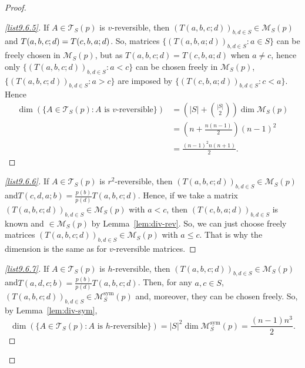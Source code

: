 \documentclass[10pt]{amsart}
\theoremstyle{definition}\newtheorem{defi}[theo]{Definition}\newtheorem{rema}[theo]{Remark}\newtheorem{exam}[theo]{Example}\newtheorem{exem}[theo]{Example}\newtheorem{nota}[theo]{Notation}
\newcounter{a}
\newcommand{\triang}[2]{\mathcal{T}_{#1} \left(#2 \right)}
\DeclareMathOperator{\sym}{sym}
\begin{document}
\begin{proof}
\begin{proof}[{\eqref{list9.6.5}}] If $A \in \triang{S}{p}$ is $v$-reversible, then $(T(a,b,c;d))_{b,d
\in S} \in \mathcal{M}_S(p)$ and $T(a,b,\linebreak c;d)= T(c,b,a;d)$. So, matrices $\{(T(a,b,a;d))_{b,d \in S} : a \in S\}$ can be freely chosen in $\mathcal{M}_S(p)$, but as $T(a,b,c;d) = T(c,b,a;d)$ when $a \neq c$, hence only $\{ (T(a,b,c;d))_{b,d \in S} : a<c \}$ can be chosen freely in $\mathcal{M}_S(p)$, $\{ (T(a,b,c;d))_{b,d \in S} : a>c \}$ are imposed by $\{ (T(c,b,a;d))_{b,d \in S} : c<a \}$. Hence
\begin{align*}
\dim \left(\{A \in \triang{S}{p} : \text{$A$ is $v$-reversible}\} \right) & = \left(|S| + \binom{|S|}{2} \right) \dim \mathcal{M}_S(p) \\
& = \left(n + \frac{n(n-1)}{2} \right) (n-1)^2\\
& = \frac{(n-1)^2 n (n+1)}{2}.
\end{align*}
\let\qed\relax
\end{proof}

\begin{proof}[{\eqref{list9.6.6}}] If $A \in \triang{S}{p}$ is $r^2$-reversible, then $(T(a,b,c;d))_{b,d \in S} \in \mathcal{M}_S(p)$ and\linebreak $T(c,d,a;b)= \frac{p(b)}{p(d)}T(a,b,c;d)$. Hence, if we take a matrix $(T(a,b,c;d))_{b,d \in S} \in \mathcal{M}_S(p)$ with $a<c$, then $(T(c,b,a;d))_{b,d \in S}$ is known and $\in \mathcal{M}_S(p)$ by Lemma~\ref{lem:div-rev}. So, we can just choose freely matrices $(T(a,b,c;d))_{b,d \in S} \in \mathcal{M}_S(p)$ with $a \leq c$. That is why the dimension is the same as for $v$-reversible matrices.
\let\qed\relax
\end{proof}

\begin{proof}[{\eqref{list9.6.7}}] If $A \in \triang{S}{p}$ is $h$-reversible, then $(T(a,b,c;d))_{b,d
\in S} \in \mathcal{M}_S(p)$ and\linebreak $T(a,d,c;b)= \frac{p(b)}{p(d)} T(a,b,c;d)$. Then, for any $a,c \in S$, $(T(a,b,c;d))_{b,d \in S} \in
\mathcal{M}^{\sym}_S(p)$ and, moreover, they can be chosen freely. So, by Lemma~\ref{lem:div-sym},
\[
\dim \left(\{A \in \triang{S}{p} : \text{$A$ is $h$-reversible}\} \right) = |S|^2 \dim \mathcal{M}^{\sym}_S(p) = \frac{(n-1) n^3}{2}.
\]
\let\qed\relax
\end{proof}


\end{proof}
\end{document}
